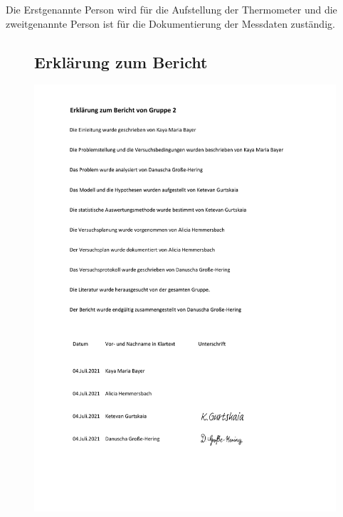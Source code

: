 \documentclass[ ngerman, fontsize= 12pt, paper=a4, headings=big, titlepage=true]{article}
\begin{document}
	Die Erstgenannte Person wird für die Aufstellung der Thermometer und die zweitgenannte Person ist für die Dokumentierung der Messdaten zuständig.	
	
	\begin{figure}[t]
		\subsection{Erklärung zum Bericht}
		\hspace{-1.3cm}
		\includegraphics[scale=0.8, page=1]{ErklaerungzumBericht2.2}
	\end{figure}
	
	
\end{document}
